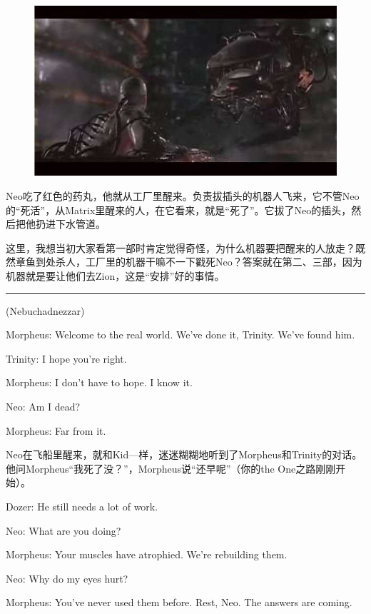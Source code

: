 \documentclass{ctexart}
\newcommand{\myparsep}{\noindent \rule[0.5ex]{\linewidth}{1pt}}
\newenvironment{myquote}{\color{green} \setlength{\leftskip}{6em} \setlength{\rightskip}{4em} \setlength{\parindent}{-2em}}{\par}
\begin{document}
\begin{figure}[htb]
\centering
\includegraphics[width=0.5\linewidth]{fig/read_Matrix-22-1}
\end{figure}

Neo吃了红色的药丸，他就从工厂里醒来。负责拔插头的机器人飞来，它不管Neo的“死活”，从Matrix里醒来的人，在它看来，就是“死了”。它拔了Neo的插头，然后把他扔进下水管道。

这里，我想当初大家看第一部时肯定觉得奇怪，为什么机器要把醒来的人放走？既然章鱼到处杀人，工厂里的机器干嘛不一下戳死Neo？答案就在第二、三部，因为机器就是要让他们去Zion，这是“安排”好的事情。

\myparsep

\begin{myquote}
(Nebuchadnezzar)

Morpheus: Welcome to the real world. We've done it, Trinity. We've found him.

Trinity: I hope you're right.

Morpheus: I don't have to hope. I know it.

Neo: Am I dead?

Morpheus: Far from it.
\end{myquote}

Neo在飞船里醒来，就和Kid—样，迷迷糊糊地听到了Morpheus和Trinity的对话。他问Morpheus“我死了没？”，Morpheus说“还早呢”（你的the One之路刚刚开始）。

\begin{myquote}
Dozer: He still needs a lot of work.

Neo: What are you doing?

Morpheus: Your muscles have atrophied. We're rebuilding them.

Neo: Why do my eyes hurt?

Morpheus: You've never used them before. Rest, Neo. The answers are coming.
\end{myquote}
\end{document}
